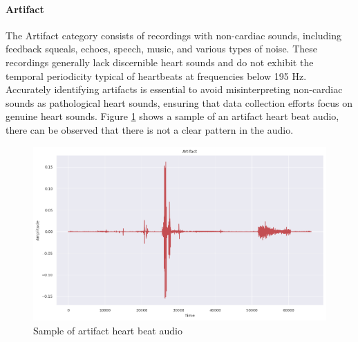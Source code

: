 \paragraph{Artifact}
The Artifact category consists of recordings with non-cardiac sounds, including feedback squeals, echoes, speech, music, and various types of noise.
These recordings generally lack discernible heart sounds and do not exhibit the temporal periodicity typical of heartbeats at frequencies below 195 Hz.
Accurately identifying artifacts is essential to avoid misinterpreting non-cardiac sounds as pathological heart sounds,
ensuring that data collection efforts focus on genuine heart sounds.
Figure \ref{fig:artifact_heart_beat_audio} shows a sample of an artifact heart beat audio, there can be observed that there is not a clear pattern in the audio.

\begin{figure}[h]
    \centering
    \includegraphics[width=\columnwidth]{../images/artifact_heart_beat_audio.png}
    \caption{Sample of artifact heart beat audio }\label{fig:artifact_heart_beat_audio}
\end{figure}

